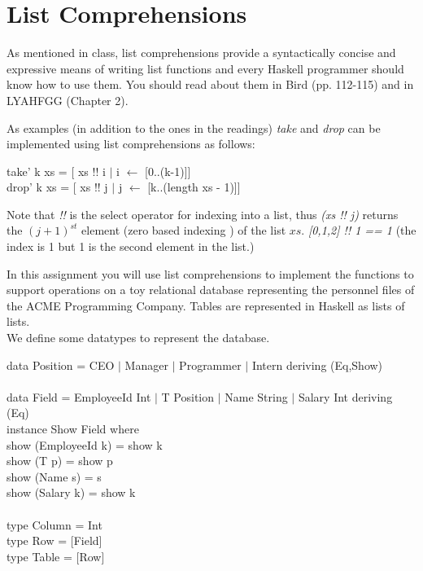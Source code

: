\documentclass[11pt]{article}
\begin{document}

\section{List Comprehensions}

As mentioned in class, list comprehensions provide a syntactically
concise and expressive means of writing list functions and every
Haskell programmer should know how to use them.  You should read about
them in Bird (pp. 112-115) and in LYAHFGG (Chapter 2).

As examples (in addition to the ones in the readings) {\it{take}} and {\it{drop}} can be implemented using list comprehensions as follows:

\begin{program**}
\> take' k xs = [ xs !! i $\mid$ i $\leftarrow$ [0..(k-1)]] \\
\> drop' k xs = [ xs !! j $\mid$ j $\leftarrow$ [k..(length xs - 1)]]
\end{program**}

Note that {\it{!!}} is the select operator for indexing into a list, thus
{\it{(xs !! j)}} returns the $(j+1)^{st}$ element (zero based indexing ) of the
list $xs$. {\it{[0,1,2] !! 1 == 1}} (the index is 1 but 1 is the second element
in the list.)


\problem{}

In this assignment you will use list comprehensions to implement the
functions to support operations on a toy relational database
representing the personnel files of the ACME Programming Company.
Tables are represented in Haskell as lists of lists.
\ \\
We define some datatypes to represent the database.

\begin{program**}
\> data Position = CEO $\mid$ Manager $\mid$ Programmer $\mid$ Intern  deriving (Eq,Show)\\
\> \\
\> data Field = EmployeeId Int $\mid$ T Position $\mid$ Name String $\mid$ Salary Int deriving (Eq) \vspace{1em}\\
\> instance Show Field where  \\
\>    show (EmployeeId k) = show k  \\
\>    show (T p) = show p  \\
\>    show (Name s) = s  \\
\>    show (Salary k) = show k  \\
\> \\
\> type Column = Int \\
\> type Row = [Field]\\
\> type Table = [Row]\\
\end{program**}
\end{document}
